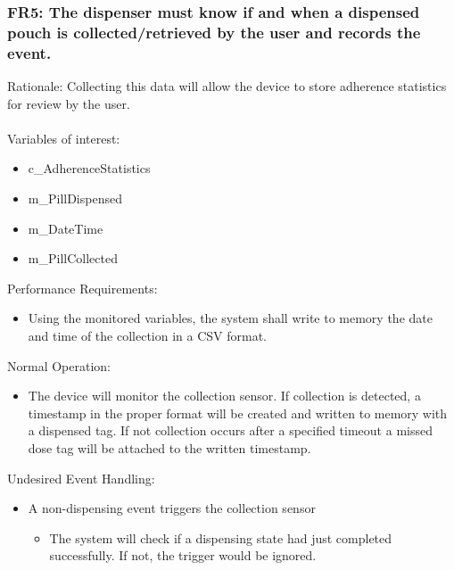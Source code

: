 \documentclass[12pt]{article}
\begin{document}
\subsubsection*{FR5: The dispenser must know if and when a dispensed pouch is collected/retrieved by the user and records the event.}
Rationale: Collecting this data will allow the device to store adherence statistics for review by the user.
\\\\
Variables of interest:
\begin{itemize}[noitemsep,topsep=0pt]
    \item c\_AdherenceStatistics
    \item m\_PillDispensed
    \item m\_DateTime
    \item m\_PillCollected
\end{itemize} 
\bigskip
Performance Requirements:
\begin{itemize}[noitemsep,topsep=0pt]
    \item Using the monitored variables, the system shall write to memory the date and time of the collection in a CSV format.
\end{itemize}
\bigskip
Normal Operation:
\begin{itemize}[noitemsep,topsep=0pt]
    \item The device will monitor the collection sensor. If collection is detected, a timestamp in the proper format will be created and written to memory with a dispensed tag. If not collection occurs after a specified timeout a missed dose tag will be attached to the written timestamp.
\end{itemize}
\bigskip
Undesired Event Handling:
\begin{itemize}[noitemsep,topsep=0pt]
    \item A non-dispensing event triggers the collection sensor
    \begin{itemize}
        \item The system will check if a dispensing state had just completed successfully. If not, the trigger would be ignored.
    \end{itemize}
\end{itemize}
\bigskip

\end{document}
